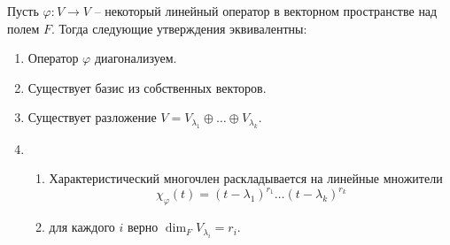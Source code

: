 \begin{claim}\label{claim::DiagCrit}
Пусть $\varphi\colon V\to V$ -- некоторый линейный оператор в векторном пространстве над полем $F$. Тогда следующие утверждения эквивалентны:
\begin{enumerate}
\item Оператор $\varphi$ диагонализуем.
\item Существует базис из собственных векторов.
\item Существует разложение $V = V_{\lambda_1}\oplus \ldots \oplus V_{\lambda_k}$.
\item 
\begin{enumerate}
\item Характеристический многочлен раскладывается на линейные множители 
\[
\chi_{\varphi}(t) = (t - \lambda_1)^{r_1} \ldots (t - \lambda_k)^{r_k}
\]
\item для каждого $i$ верно $\dim_F V_{\lambda_i} = r_i$.
\end{enumerate}
\end{enumerate}
\end{claim}
